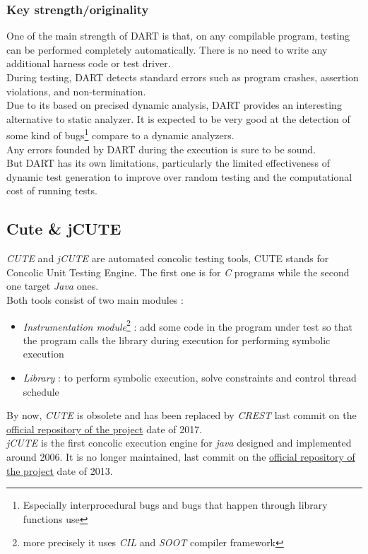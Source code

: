 \documentclass[11pt]{IEEEtran}
\begin{document}
	    \subsubsection{Key strength/originality}
	    	One of the main strength of DART is that, on any compilable program, testing can be performed completely automatically. There is no need to write any additional harness code or test driver.\\
	    	During testing, DART detects standard errors such as program crashes, assertion violations, and non-termination.\\
	    	Due to its based on precised dynamic analysis, DART provides an interesting alternative to static analyzer. It is expected to be very good at the detection of some kind of bugs\footnote{Especially  interprocedural bugs and bugs that happen through library functions use} compare to a dynamic analyzers.\\
	    	Any errors founded by DART during the execution is sure to be sound.\\

	    	But DART has its own limitations, particularly the limited effectiveness of dynamic test generation to improve over random testing and the computational cost of running tests.

	\subsection{Cute \& jCUTE}
		\emph{CUTE} and \emph{jCUTE} are automated concolic testing tools, CUTE stands for Concolic Unit Testing Engine\cite{sen2006cute}. The first one is for \emph{C} programs while the second one target \emph{Java} ones.\\

		Both tools consist of two main modules :
		\begin{itemize}
			\item \emph{Instrumentation module}\footnote{more precisely it uses \emph{CIL} and \emph{SOOT} compiler framework} : add some code in the program under test so that the program calls the library during execution
for performing symbolic execution %
			\item \emph{Library} : to perform symbolic execution, solve constraints and control thread schedule
		\end{itemize}

		By now, \emph{CUTE} is obsolete and has been replaced by \emph{CREST}\cite{CuteWebSite} last commit on the \href{https://github.com/jburnim/crest}{official repository of the project} date of 2017. \\
		\emph{jCUTE} is the first concolic execution engine for \emph{java} \cite{jDart} designed and implemented around 2006. It is no longer maintained, last commit on the \href{https://github.com/osl/jcute}{official repository of the project} date of 2013.
\end{document}

